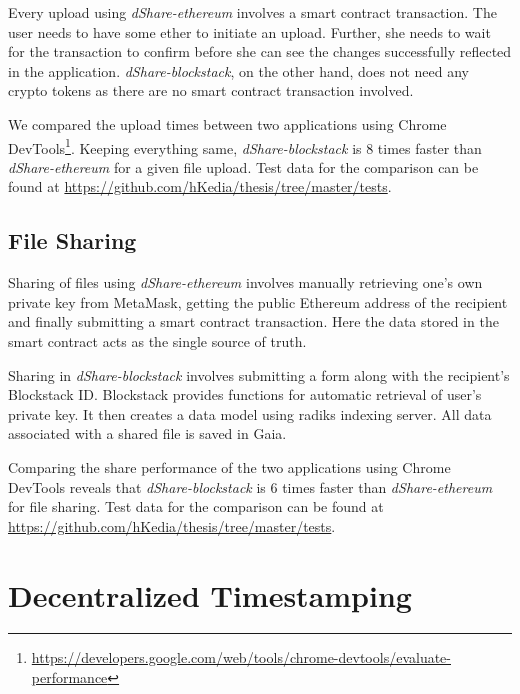		Every upload using \textit{dShare-ethereum} involves a smart contract transaction. The user needs to have some ether to initiate an upload. Further, she needs to wait for the transaction to confirm before she can see the changes successfully reflected in the application. \textit{dShare-blockstack}, on the other hand, does not need any crypto tokens as there are no smart contract transaction involved.
		
		We compared the upload times between two applications using Chrome DevTools\footnote{\url{https://developers.google.com/web/tools/chrome-devtools/evaluate-performance}}. Keeping everything same, \textit{dShare-blockstack} is 8 times faster than \textit{dShare-ethereum} for a given file upload. Test data for the comparison can be found at \url{https://github.com/hKedia/thesis/tree/master/tests}.
		
		\subsection{File Sharing}
		Sharing of files using \textit{dShare-ethereum} involves manually retrieving one's own private key from MetaMask, getting the public Ethereum address of the recipient and finally submitting a smart contract transaction. Here the data stored in the smart contract acts as the single source of truth.
		
		Sharing in \textit{dShare-blockstack} involves submitting a form along with the recipient's Blockstack ID. Blockstack provides functions for automatic retrieval of user's private key. It then creates a data model using radiks indexing server. All data associated with a shared file is saved in Gaia.
		
		Comparing the share performance of the two applications using Chrome DevTools reveals that \textit{dShare-blockstack} is 6 times faster than \textit{dShare-ethereum} for file sharing. Test data for the comparison can be found at \url{https://github.com/hKedia/thesis/tree/master/tests}.
		
	\section{Decentralized Timestamping}
	
